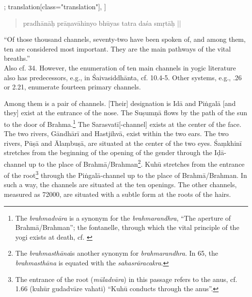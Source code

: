 \begin{alignment}[
  texts=edition[class="edition"];
  translation[class="translation"],
  ]
\begin{translation}
\begin{tlate}
{\begin{quote}
pradhānāḥ prāṇavāhinyo bhūyas tatra daśa smṛtāḥ || \end{quote} ``Of those thousand channels, seventy-two have been spoken of, and among them, ten are considered most important. They are the main pathways of the vital breaths.''\\ Also cf.  34. However, the enumeration of ten main channels in yogic literature also has predecessors, e.g., in Śaivasiddhānta, cf.  10.4-5. Other systems, e.g.,  .26 or  2.21, enumerate fourteen primary channels.} Among them is a pair of channels. [Their] designation is Idā and Piṅgalā [and they] exist at the entrance of the nose. The Suṣumṇā flows by the path of the sun to the door of Brahma.\footnote{The \textit{brahmadvāra} is a synonym for the \textit{brahmarandhra}, ``The aperture of Brahmā/Brahman''; the fontanelle, through which the vital principle of the yogi exists at death, cf. \citeauthor[2017:438]{rootsofyoga2017}}\textsuperscript{\coro{[\lowroman{5}]}} The Sarasvatī[-channel] exists at the center of the face. The two rivers, Gāndhārī and Hastjihvā, exist within the two ears. The two rivers, Pūṣā and Ālaṃbuṣā, are situated at the center of the two eyes. Śaṃkhinī stretches from the beginning of the opening of the gender through the Iḍā-channel up to the place of Brahmā/Brahman\footnote{The \textit{brahmasthāna}is another synonym for \textit{brahmarandhra}. In  65, the \textit{brahmasthāna} is equated with the \textit{sahasrāracakra}.}. Kuhū stretches from the entrance of the root\footnote{The entrance of the root (\textit{mūladvāra}) in this passage refers to the anus, cf.  1.66 (kuhūr gudadvāre vahati) ``Kuhū conducts through the anus''.} through the Piṅgalā-channel up to the place of Brahmā/Brahman.\textsuperscript{\coro{[\lowroman{10}]}} In such a way, the channels are situated at the ten openings. The other channels, measured as 72000, are situated with a subtle form at the roots of the hairs.
\end{tlate}
  \end{translation}
\end{alignment}
